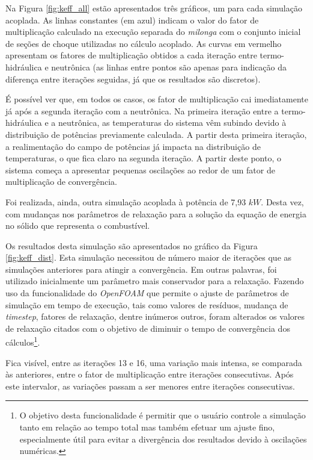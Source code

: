 Na Figura \ref{fig:keff_all} estão apresentados três gráficos, um para cada simulação
acoplada. As linhas constantes (em azul) indicam o valor do fator de multiplicação
calculado na execução separada do \textit{milonga} com o conjunto inicial de seções
de choque utilizadas no cálculo acoplado. As curvas em vermelho apresentam os fatores
de multiplicação obtidos a cada iteração entre termo-hidráulica e neutrônica (as linhas
entre pontos são apenas para indicação da diferença entre iterações seguidas, já
que os resultados são discretos).

É possível ver que, em todos os casos, os fator de multiplicação cai imediatamente
já após a segunda iteração com a neutrônica. Na primeira iteração entre a
termo-hidráulica e a neutrônica, as temperaturas do sistema vêm subindo devido
à distribuição de potências previamente calculada. A partir desta primeira iteração,
a realimentação do campo de potências já impacta na distribuição de temperaturas,
o que fica claro na segunda iteração. A partir deste ponto, o sistema começa a
apresentar pequenas oscilações ao redor de um fator de multiplicação de convergência.

%
%
%

Foi realizada, ainda, outra simulação acoplada à potência de 7,93 $kW$.
Desta vez, com mudanças nos parâmetros de relaxação para a solução
da equação de energia no sólido que representa o combustível.

Os resultados desta simulação são apresentados no gráfico da Figura \ref{fig:keff_dist}.
Esta simulação necessitou de número maior de iterações que as simulações anteriores para
atingir a convergência. Em outras palavras, foi utilizado inicialmente um parâmetro
mais conservador para a relaxação. Fazendo uso da funcionalidade do \textit{OpenFOAM}
que permite o ajuste de parâmetros de simulação em tempo de execução, tais como
valores de resíduos, mudança de \textit{timestep}, fatores de relaxação, dentre
inúmeros outros, foram alterados os valores de relaxação citados com o objetivo
de diminuir o tempo de convergência dos cálculos\footnote{O objetivo desta funcionalidade é permitir que o
usuário controle a simulação tanto em relação ao tempo total mas também
efetuar um ajuste fino, especialmente útil para evitar a divergência dos
resultados devido à oscilações numéricas.}.

Fica visível, entre as iterações 13 e 16, uma variação mais intensa, se comparada
às anteriores, entre o fator de multiplicação entre iterações consecutivas. Após
este intervalor, as variações passam a ser menores entre iterações consecutivas.

